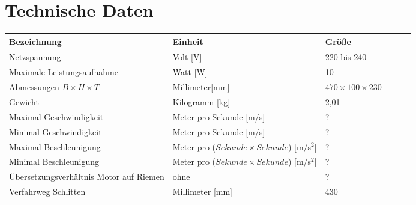 %
%

\chapter{Technische Daten}
	\fontsize{8}{10}\selectfont
\begin{tabularx}{\textwidth}{|X|X|X|X|p{1cm}|X|}
	\hline 
	\textbf{Bezeichnung} & \textbf{Einheit} & \textbf{Größe} \\ \hline
	Netzspannung & Volt [V] & 220 bis 240  \\
	\hline
	Maximale Leistungsaufnahme & Watt [W] & 10  \\
	\hline
    Abmessungen $B \times H \times T$ & Millimeter[mm] & $470 \times 100 \times 230$ \\
    \hline
    Gewicht & Kilogramm [kg] & 2,01 \\
    \hline 
    Maximal Geschwindigkeit & Meter pro Sekunde [m/s] & ?\\
    \hline	
    Minimal Geschwindigkeit & Meter pro Sekunde [m/s] & ?\\
    \hline
    Maximal Beschleunigung & Meter pro ($Sekunde \times Sekunde$) [m/s$^{2}$] & ? \\
    \hline
    Minimal Beschleunigung & Meter pro ($Sekunde \times Sekunde$) [m/s$^{2}$] & ? \\
    \hline
    Übersetzungsverhältnis Motor auf Riemen & ohne & ?\\
    \hline
    Verfahrweg Schlitten & Millimeter [mm] & 430 \\
    \hline
    \end{tabularx}





